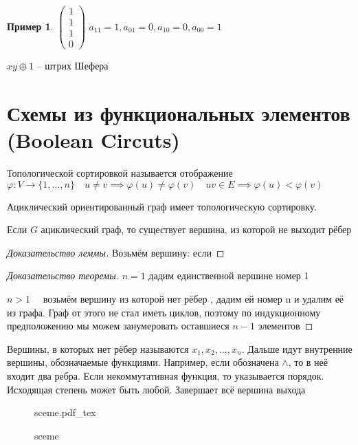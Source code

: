 \documentclass{book}
\theoremstyle{definition}
\newtheorem*{example}{Пример}
\newcommand{\incfig}[1]{%
    \def\svgwidth{\columnwidth}
    {#1.pdf_tex}
}
\begin{document}
\begin{example}
    $  \begin{pmatrix}1\\1\\1\\0  \end{pmatrix} $
        $a_{11}=1, a_{01}=0, a_{10}=0, a_{00} = 1$

        $xy\oplus 1$ -- штрих Шефера
\end{example}

\section{Схемы из функциональных элементов (Boolean Circuts)}

\begin{definition}
    Топологической сортировкой называется отображение $\varphi:V \to  \{1, \ldots, n\}\quad u\neq v \implies  \varphi(u)\neq \varphi(v)\quad uv\in E \implies  \varphi(u)<\varphi(v)$
\end{definition}

\begin{theorem}
    Ациклический ориентированный граф имеет топологическую сортировку.
\end{theorem}
\begin{lemma}
    Если $G$ ациклический граф, то существует вершина, из которой не выходит рёбер
\end{lemma}
\begin{proof}
    [Доказательство леммы]
    Возьмём вершину: если 

\end{proof}
\begin{proof}
    [Доказательство теоремы]

   $n=1$ дадим единственной вершине номер 1

   $n>1\quad $ возьмём вершину из которой нет рёбер , дадим ей номер n и удалим её из графа. Граф от этого не стал иметь циклов, поэтому по индукционному предположению мы можем занумеровать оставшиеся $n-1$ элементов
\end{proof}

Вершины, в которых нет рёбер называются $x_1, x_2, \ldots, x_{n} $. Дальше идут внутренние вершины, обозначаемые функциями. Например, если обозначена $\land$, то в неё входит два ребра. Если некоммутативная функция, то указывается порядок. Исходящая степень может быть любой. Завершает всё вершина выхода

\begin{figure}[ht]
    \centering
    \incfig{sceme}
    \caption{sceme}
    \label{fig:sceme}
\end{figure}
\end{document}
